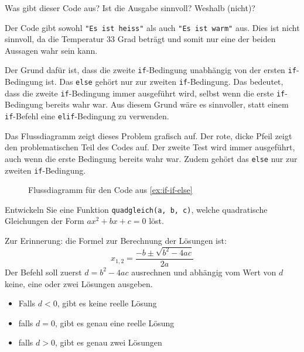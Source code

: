 \begin{myexercise}\label{ex:if-if-else}
	Was gibt dieser Code aus? Ist die Ausgabe sinnvoll? Weshalb (nicht)?
	
	\begin{myanswer}
		Der Code gibt sowohl \lstinline|"Es ist heiss"| als auch \lstinline|"Es ist warm"| aus. Dies ist nicht sinnvoll, da die Temperatur 33 Grad beträgt und somit nur eine der beiden Aussagen wahr sein kann.

		Der Grund dafür ist, dass die zweite \lstinline|if|-Bedingung unabhängig von der ersten \lstinline|if|-Bedingung ist. Das \lstinline|else| gehört nur zur zweiten \lstinline|if|-Bedingung. Das bedeutet, dass die zweite \lstinline|if|-Bedingung immer ausgeführt wird, selbst wenn die erste \lstinline|if|-Bedingung bereits wahr war. Aus diesem Grund wäre es sinnvoller, statt einem \lstinline|if|-Befehl eine \lstinline|elif|-Bedingung zu verwenden.

		Das Flussdiagramm zeigt dieses Problem grafisch auf. Der rote, dicke Pfeil zeigt den problematischen Teil des Codes auf. Der zweite Test wird immer ausgeführt, auch wenn die erste Bedingung bereits wahr war. Zudem gehört das \lstinline|else| nur zur zweiten \lstinline|if|-Bedingung.

		\begin{figure}[H]
			\centering
			
			\caption{Flussdiagramm für den Code aus \cref{ex:if-if-else}}
			\label{fig:if-if-else}
		\end{figure}
	\end{myanswer}
\end{myexercise}

\begin{myexercise}
	Entwickeln Sie eine Funktion \lstinline|quadgleich(a, b, c)|, welche quadratische Gleichungen der Form \(ax^2 + bx + c = 0\) löst.

	Zur Erinnerung: die Formel zur Berechnung der Lösungen ist:
	\begin{equation}
		x_{1,2} = \frac{-b \pm \sqrt{b^2 - 4ac}}{2a}
	\end{equation}
	Der Befehl soll zuerst \(d = b^2 - 4ac\) ausrechnen und abhängig vom Wert von $d$ keine, eine oder zwei Lösungen ausgeben.
	\begin{itemize}
		\item Falls $d < 0$, gibt es keine reelle Lösung
		\item falls $d = 0$, gibt es genau eine reelle Lösung
		\item falls $d > 0$, gibt es genau zwei Lösungen
	\end{itemize}
	\begin{myanswer}
		
	\end{myanswer}
\end{myexercise}


